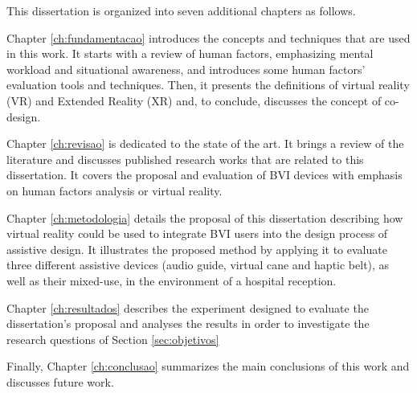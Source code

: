 This dissertation is organized into seven additional chapters as follows.

Chapter \ref{ch:fundamentacao} introduces the concepts and techniques that are used in this work. It starts with a review of human factors, emphasizing mental workload and situational awareness, and introduces some human factors' evaluation tools and techniques. Then, it presents the definitions of virtual reality (VR) and Extended Reality (XR) and, to conclude, discusses the concept of co-design.

Chapter \ref{ch:revisao} is dedicated to the state of the art. It brings a review of the literature and discusses published research works that are related to this dissertation. It covers the proposal and evaluation of BVI devices with emphasis on human factors analysis or virtual reality.

Chapter \ref{ch:metodologia} details the proposal of this dissertation describing how virtual reality could be used to integrate BVI users into the design process of assistive design. It illustrates the proposed method by applying it to evaluate three different assistive devices (audio guide, virtual cane and haptic belt), as well as their mixed-use, in the environment of a hospital reception. 

Chapter \ref{ch:resultados} describes the experiment designed to evaluate the dissertation's proposal and analyses the results in order to investigate the research questions of Section \ref{sec:objetivos}

Finally, Chapter \ref{ch:conclusao} summarizes the main conclusions of this work and discusses future work.
